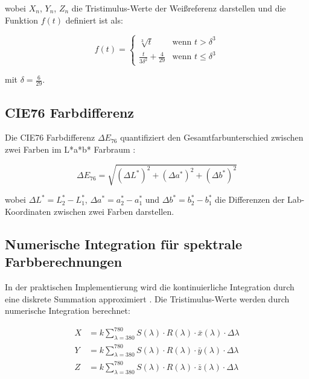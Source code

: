 wobei $X_n$, $Y_n$, $Z_n$ die Tristimulus-Werte der Weißreferenz darstellen und die Funktion $f(t)$ definiert ist als:

\begin{equation}
f(t) = \begin{cases}
\sqrt[3]{t} & \text{wenn } t > \delta^3 \\
\frac{t}{3\delta^2} + \frac{4}{29} & \text{wenn } t \leq \delta^3
\end{cases}
\label{eq:lab_function}
\end{equation}

mit $\delta = \frac{6}{29}$.

\subsection{CIE76 Farbdifferenz}

Die CIE76 Farbdifferenz $\Delta E_{76}$ quantifiziert den Gesamtfarbunterschied zwischen zwei Farben im L*a*b* Farbraum \parencite{CIE15:2018, CIELAB1976}:

\begin{equation}
\Delta E_{76} = \sqrt{(\Delta L^*)^2 + (\Delta a^*)^2 + (\Delta b^*)^2}
\label{eq:delta_e_76}
\end{equation}

wobei $\Delta L^* = L_2^* - L_1^*$, $\Delta a^* = a_2^* - a_1^*$ und $\Delta b^* = b_2^* - b_1^*$ die Differenzen der Lab-Koordinaten zwischen zwei Farben darstellen.

\subsection{Numerische Integration für spektrale Farbberechnungen}

In der praktischen Implementierung wird die kontinuierliche Integration durch eine diskrete Summation approximiert \parencite{Wyszecki1982, Hunt1999}. Die Tristimulus-Werte werden durch numerische Integration berechnet:

\begin{align}
X &= k \sum_{\lambda=380}^{780} S(\lambda) \cdot R(\lambda) \cdot \bar{x}(\lambda) \cdot \Delta\lambda \label{eq:tristimulus_integration_x}\\
Y &= k \sum_{\lambda=380}^{780} S(\lambda) \cdot R(\lambda) \cdot \bar{y}(\lambda) \cdot \Delta\lambda \label{eq:tristimulus_integration_y}\\
Z &= k \sum_{\lambda=380}^{780} S(\lambda) \cdot R(\lambda) \cdot \bar{z}(\lambda) \cdot \Delta\lambda \label{eq:tristimulus_integration_z}
\end{align}

